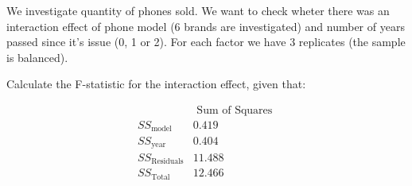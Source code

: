 
\begin{question}
We investigate quantity of phones sold. We want to check wheter there was an interaction effect of phone model (6 brands are investigated) and number of years passed since it's issue (0, 1 or 2). For each factor we have 3 replicates (the sample is balanced).

Calculate the F-statistic for the interaction effect, given that:

\[
\begin{array}{l|r} 
& \text { Sum of Squares } \\\hline
SS_{ \text{model} }  & 0.419 \\
SS_{ \text{year} }  & 0.404 \\
SS_{ \text{Residuals} }  & 11.488  \\
SS_{ \text{Total} }  & 12.466 \\
\end{array}
\]
\end{question}


